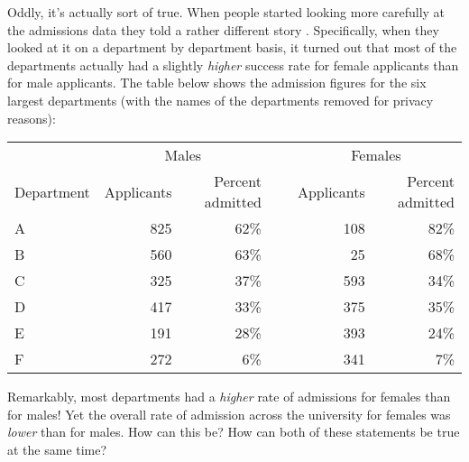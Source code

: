 Oddly, it's actually sort of true. When people started looking more carefully at the admissions data they told a rather different story \parencite{Bickel1975}. Specifically, when they looked at it on a department by department basis, it turned out that most of the departments actually had a slightly {\it higher} success rate for female applicants than for male applicants. The table below shows the admission figures for the six largest departments (with the names of the departments removed for privacy reasons):
\begin{center}
\begin{tabular}{lrrrrr}
\hline
~          & \multicolumn{2}{c}{Males}     & ~ & \multicolumn{2}{c}{Females}   \\
\cline{2-3} \cline{5-6}
Department & Applicants	& Percent admitted & ~ & Applicants & Percent admitted \\
\hline
A          &        825 &             62\% & ~ &        108 &             82\% \\
B          &        560 &             63\% & ~ &         25 &             68\% \\
C          &        325	&             37\% & ~ &        593 &             34\% \\
D          &        417	&             33\% & ~ &        375 &             35\% \\
E          &        191	&             28\% & ~ &        393 &             24\% \\
F          &        272	&              6\% & ~ &        341 &              7\% \\
\hline
\end{tabular}
\end{center}
\noindent
Remarkably, most departments had a {\it higher} rate of admissions for females than for males! Yet the overall rate of admission across the university for females was {\it lower} than for males.  How can this be? How can both of these statements be true at the same time?


